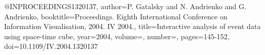 @INPROCEEDINGS{1320137,
  author={P. {Gatalsky} and N. {Andrienko} and G. {Andrienko}},
  booktitle={Proceedings. Eighth International Conference on Information Visualisation, 2004. IV 2004.}, 
  title={Interactive analysis of event data using space-time cube}, 
  year={2004},
  volume={},
  number={},
  pages={145-152},
  doi={10.1109/IV.2004.1320137}}